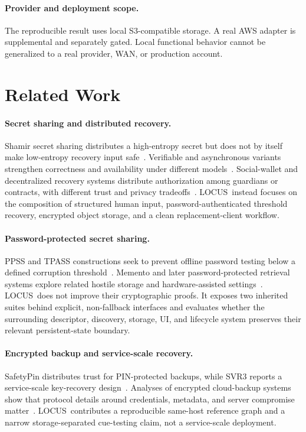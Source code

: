\documentclass[sigconf,anonymous]{acmart}
\newcommand{\LOCUS}{\textsf{LOCUS}}
\begin{document}
\paragraph{Provider and deployment scope.}
The reproducible result uses local S3-compatible storage. A real AWS adapter
is supplemental and separately gated. Local functional behavior cannot be
generalized to a real provider, WAN, or production account.

\section{Related Work}
\label{sec:related}

\paragraph{Secret sharing and distributed recovery.}
Shamir secret sharing distributes a high-entropy secret but does not by itself
make low-entropy recovery input safe~\cite{Shamir1979}. Verifiable and
asynchronous variants strengthen correctness and availability under different
models~\cite{Feldman1987,PVSS1999,AVSS2002}. Social-wallet and decentralized
recovery systems distribute authorization among guardians or contracts, with
different trust and privacy tradeoffs~\cite{DAppRecovery2019,CRSA2021,SocialWallet2023}.
\LOCUS\ instead focuses on the composition of structured human input,
password-authenticated threshold recovery, encrypted object storage, and a
clean replacement-client workflow.

\paragraph{Password-protected secret sharing.}
PPSS and TPASS constructions seek to prevent offline password testing below a
defined corruption threshold~\cite{Bagherzandi2011PPSS,Jarecki2014PPSS,PPSS2016,Yi2015TPASS,Yi2019TPASS}.
Memento and later password-protected retrieval systems explore related hostile
storage and hardware-assisted settings~\cite{Camenisch2014Memento,PPKR2024}.
\LOCUS\ does not improve their cryptographic proofs. It exposes two inherited
suites behind explicit, non-fallback interfaces and evaluates whether the
surrounding descriptor, discovery, storage, UI, and lifecycle system preserves
their relevant persistent-state boundary.

\paragraph{Encrypted backup and service-scale recovery.}
SafetyPin distributes trust for PIN-protected backups, while SVR3 reports a
service-scale key-recovery design~\cite{SafetyPin2020,SVR3_2024}. Analyses of
encrypted cloud-backup systems show that protocol details around credentials,
metadata, and server compromise matter~\cite{WhatsAppBackup2023}. \LOCUS\
contributes a reproducible same-host reference graph and a narrow
storage-separated cue-testing claim, not a service-scale deployment.
\end{document}
